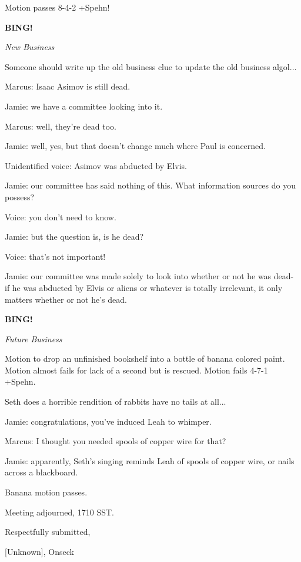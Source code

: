 \documentclass[12pt]{article}
\newcommand{\bing}{{\bf BING!} }
\newcommand{\goto}[1]{\bing \vskip 12pt \centerline{{\em{#1}}}}
\begin{document}
Motion passes 8-4-2 +Spehn!

\goto{New Business}

Someone should write up the old business clue to update the old business algol...

Marcus: Isaac Asimov is still dead.

Jamie: we have a committee looking into it.

Marcus: well, they're dead too.

Jamie: well, yes, but that doesn't change much where Paul is concerned.

Unidentified voice: Asimov was abducted by Elvis.

Jamie: our committee has said nothing of this. What information sources do you possess?

Voice: you don't need to know.

Jamie: but the question is, is he dead?

Voice: that's not important!

Jamie: our committee was made solely to look into whether or not he was dead- if he was abducted by Elvis or aliens or whatever is totally irrelevant, it only matters whether or not he's dead.

\goto{Future Business}

Motion to drop an unfinished bookshelf into a bottle of banana colored paint. Motion almost fails for lack of a second but is rescued. Motion fails 4-7-1 +Spehn.

Seth does a horrible rendition of rabbits have no tails at all...

Jamie: congratulations, you've induced Leah to whimper.

Marcus: I thought you needed spools of copper wire for that?

Jamie: apparently, Seth's singing reminds Leah of spools of copper wire, or nails across a blackboard.

Banana motion passes.

\vspace{12pt}

\noindent
Meeting adjourned, 1710 SST.

\vspace{18pt}

\centerline{Respectfully submitted,}
\centerline{[Unknown], Onseck}
\end{document}
